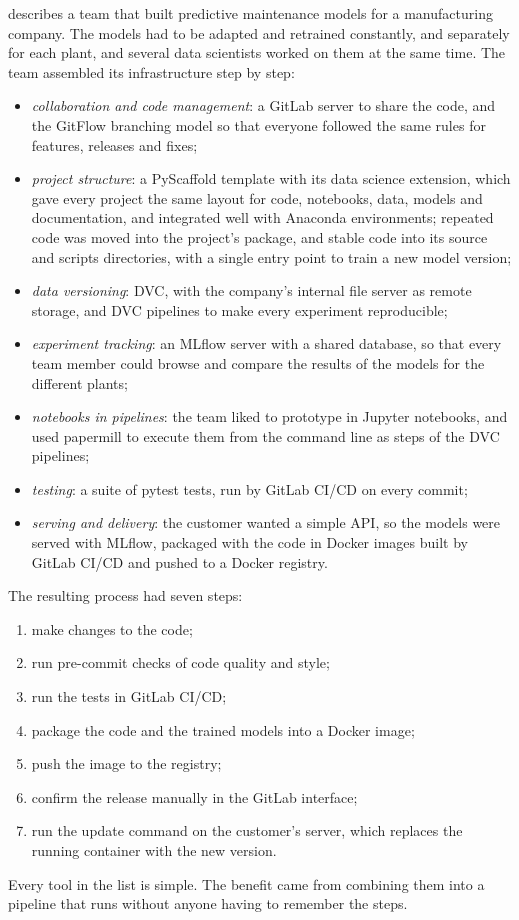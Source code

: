 \citet{dubovikov2019managing} describes a team that built predictive maintenance models for a manufacturing
company. The models had to be adapted and retrained constantly, and separately for each plant, and several
data scientists worked on them at the same time. The team assembled its infrastructure step by step:
\begin{itemize}
  \item \emph{collaboration and code management}: a GitLab server to share the code, and the GitFlow
        branching model so that everyone followed the same rules for features, releases and fixes;
  \item \emph{project structure}: a PyScaffold template with its data science extension, which gave every
        project the same layout for code, notebooks, data, models and documentation, and integrated well with
        Anaconda environments; repeated code was moved into the project's package, and stable code into its
        source and scripts directories, with a single entry point to train a new model version;
  \item \emph{data versioning}: DVC, with the company's internal file server as remote storage, and DVC
        pipelines to make every experiment reproducible;
  \item \emph{experiment tracking}: an MLflow server with a shared database, so that every team member could
        browse and compare the results of the models for the different plants;
  \item \emph{notebooks in pipelines}: the team liked to prototype in Jupyter notebooks, and used papermill to
        execute them from the command line as steps of the DVC pipelines;
  \item \emph{testing}: a suite of pytest tests, run by GitLab CI/CD on every commit;
  \item \emph{serving and delivery}: the customer wanted a simple API, so the models were served with MLflow,
        packaged with the code in Docker images built by GitLab CI/CD and pushed to a Docker registry.
\end{itemize}
The resulting process had seven steps: \begin{enumerate}
\item make changes to the code; \item run pre-commit checks of code quality and
style; \item run the tests in GitLab CI/CD; \item package the code and the trained models into a Docker image; \item push the
image to the registry; \item confirm the release manually in the GitLab interface; \item run the update command on
the customer's server, which replaces the running container with the new version.
\end{enumerate} Every tool in the list is
simple. The benefit came from combining them into a pipeline that runs without anyone having to
remember the steps.

